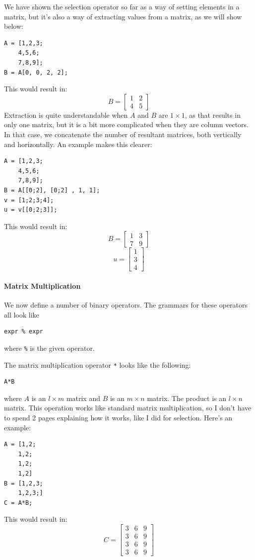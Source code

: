 We have shown the selection operator so far as a way of setting elements in a matrix, but it's also a way of extracting values from a matrix, as we will show below:
\begin{lstlisting}
A = [1,2,3;
    4,5,6;
    7,8,9];
B = A[0, 0, 2, 2];
\end{lstlisting}
This would result in:
$$B=\begin{bmatrix}1 & 2\\4 &5 \end{bmatrix}$$
Extraction is quite understandable when $A$ and $B$ are $1\times 1$, as that results in only one matrix, but it is a bit more complicated when they are column vectors.  In that case, we concatenate the number of resultant matrices, both vertically and horizontally.  An example makes this clearer:
\begin{lstlisting}
A = [1,2,3;
    4,5,6;
    7,8,9];
B = A[[0;2], [0;2] , 1, 1];
v = [1;2;3;4];
u = v[[0;2;3]];
\end{lstlisting}
This would result in:
$$B=\begin{bmatrix}1 & 3\\7 &9 \end{bmatrix}$$
$$u=\begin{bmatrix}1\\3\\4\end{bmatrix}$$

\paragraph{Matrix Multiplication}
We now define a number of binary operators.  The grammars for these operators all look like
\begin{lstlisting}
expr % expr
\end{lstlisting}
where \verb=%= is the given operator.

The matrix multiplication operator \verb=*= looks like the following:
\begin{lstlisting}
A*B
\end{lstlisting}
where $A$ is an $l\times m$ matrix and $B$ is an $m \times n$ matrix.  The product is an $l \times n$ matrix.  This operation works like standard matrix multiplication, so I don't have to spend 2 pages explaining how it works, like I did for selection.  Here's an example:
\begin{lstlisting}
A = [1,2;
    1,2;
    1,2;
    1,2]
B = [1,2,3;
    1,2,3;]
C = A*B;
\end{lstlisting}
This would result in:
$$C=\begin{bmatrix}3 & 6 & 9\\3 & 6 & 9\\3 & 6 & 9\\3 & 6 & 9\end{bmatrix}$$

